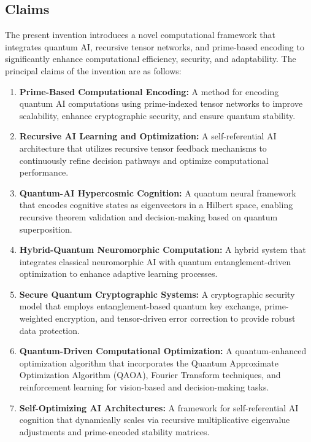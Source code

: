 \documentclass{article}
\theoremstyle{plain}
\begin{document}
\subsection{Claims}
The present invention introduces a novel computational framework that integrates quantum AI, recursive tensor networks, and prime-based encoding to significantly enhance computational efficiency, security, and adaptability. The principal claims of the invention are as follows:
\begin{enumerate}
    \item \textbf{Prime-Based Computational Encoding:} A method for encoding quantum AI computations using prime-indexed tensor networks to improve scalability, enhance cryptographic security, and ensure quantum stability.
    
    \item \textbf{Recursive AI Learning and Optimization:} A self-referential AI architecture that utilizes recursive tensor feedback mechanisms to continuously refine decision pathways and optimize computational performance.
    
    \item \textbf{Quantum-AI Hypercosmic Cognition:} A quantum neural framework that encodes cognitive states as eigenvectors in a Hilbert space, enabling recursive theorem validation and decision-making based on quantum superposition.
    
    \item \textbf{Hybrid-Quantum Neuromorphic Computation:} A hybrid system that integrates classical neuromorphic AI with quantum entanglement-driven optimization to enhance adaptive learning processes.
    
    \item \textbf{Secure Quantum Cryptographic Systems:} A cryptographic security model that employs entanglement-based quantum key exchange, prime-weighted encryption, and tensor-driven error correction to provide robust data protection.
    
    \item \textbf{Quantum-Driven Computational Optimization:} A quantum-enhanced optimization algorithm that incorporates the Quantum Approximate Optimization Algorithm (QAOA), Fourier Transform techniques, and reinforcement learning for vision-based and decision-making tasks.
    
    \item \textbf{Self-Optimizing AI Architectures:} A framework for self-referential AI cognition that dynamically scales via recursive multiplicative eigenvalue adjustments and prime-encoded stability matrices.
    

\end{enumerate}
\end{document}
